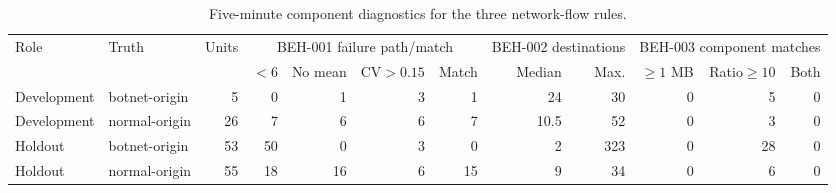 \begin{table}[htbp]
\centering
\caption{Five-minute component diagnostics for the three network-flow rules.}
\label{tab:ctu13-threshold-diagnostics}
\small
\begin{adjustbox}{max width=\textwidth}
\begin{tabular}{llrrrrrrrrrr}
\toprule
Role & Truth & Units & \multicolumn{4}{c}{BEH-001 failure path/match} & \multicolumn{2}{c}{BEH-002 destinations} & \multicolumn{3}{c}{BEH-003 component matches} \\
\cmidrule(lr){4-7}\cmidrule(lr){8-9}\cmidrule(lr){10-12}
 & & & $<6$ & No mean & CV$>0.15$ & Match & Median & Max. & $\geq1$ MB & Ratio$\geq10$ & Both \\
\midrule
Development & botnet-origin & 5 & 0 & 1 & 3 & 1 & 24 & 30 & 0 & 5 & 0 \\
Development & normal-origin & 26 & 7 & 6 & 6 & 7 & 10.5 & 52 & 0 & 3 & 0 \\
Holdout & botnet-origin & 53 & 50 & 0 & 3 & 0 & 2 & 323 & 0 & 28 & 0 \\
Holdout & normal-origin & 55 & 18 & 16 & 6 & 15 & 9 & 34 & 0 & 6 & 0 \\
\bottomrule
\end{tabular}
\end{adjustbox}
\par{}
\par{}
\end{table}

